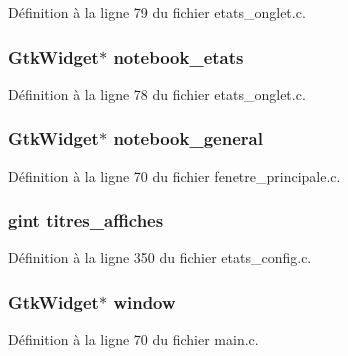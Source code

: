 Définition à la ligne 79 du fichier etats\_\-onglet.c.

\subsubsection[{notebook\_\-etats}]{\setlength{\rightskip}{0pt plus 5cm}GtkWidget$\ast$ {\bf notebook\_\-etats}}\label{etats__config_8c_ae92ea175fa6b21c845c3a0971646f6d5}


Définition à la ligne 78 du fichier etats\_\-onglet.c.

\subsubsection[{notebook\_\-general}]{\setlength{\rightskip}{0pt plus 5cm}GtkWidget$\ast$ {\bf notebook\_\-general}}\label{etats__config_8c_a8924516aa4170f932308e93cf93a785b}


Définition à la ligne 70 du fichier fenetre\_\-principale.c.

\subsubsection[{titres\_\-affiches}]{\setlength{\rightskip}{0pt plus 5cm}gint {\bf titres\_\-affiches}}\label{etats__config_8c_aa74984417afb965dc68f02651313074b}


Définition à la ligne 350 du fichier etats\_\-config.c.

\subsubsection[{window}]{\setlength{\rightskip}{0pt plus 5cm}GtkWidget$\ast$ {\bf window}}\label{etats__config_8c_a3d346c08cf2d67c388caabffb412b293}


Définition à la ligne 70 du fichier main.c.

